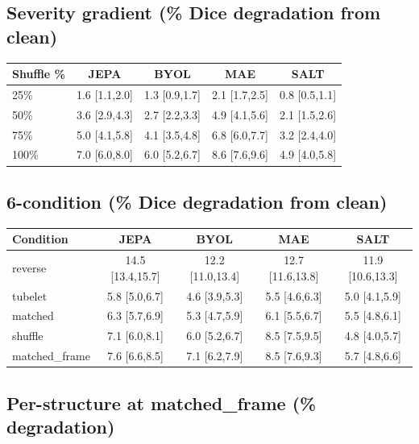 \documentclass{article}
\begin{document}
\subsection{Severity gradient (\% Dice degradation from clean)}

\begin{center}
\begin{tabular}{lcccc}
\toprule
Shuffle \% & JEPA & BYOL & MAE & SALT \\
\midrule
25\%  & 1.6 [1.1,2.0] & 1.3 [0.9,1.7] & 2.1 [1.7,2.5] & 0.8 [0.5,1.1] \\
50\%  & 3.6 [2.9,4.3] & 2.7 [2.2,3.3] & 4.9 [4.1,5.6] & 2.1 [1.5,2.6] \\
75\%  & 5.0 [4.1,5.8] & 4.1 [3.5,4.8] & 6.8 [6.0,7.7] & 3.2 [2.4,4.0] \\
100\% & 7.0 [6.0,8.0] & 6.0 [5.2,6.7] & 8.6 [7.6,9.6] & 4.9 [4.0,5.8] \\
\bottomrule
\end{tabular}
\end{center}

\subsection{6-condition (\% Dice degradation from clean)}

\begin{center}
\begin{tabular}{lcccc}
\toprule
Condition & JEPA & BYOL & MAE & SALT \\
\midrule
reverse       & 14.5 [13.4,15.7] & 12.2 [11.0,13.4] & 12.7 [11.6,13.8] & 11.9 [10.6,13.3] \\
tubelet       & 5.8 [5.0,6.7]    & 4.6 [3.9,5.3]    & 5.5 [4.6,6.3]    & 5.0 [4.1,5.9] \\
matched       & 6.3 [5.7,6.9]    & 5.3 [4.7,5.9]    & 6.1 [5.5,6.7]    & 5.5 [4.8,6.1] \\
shuffle       & 7.1 [6.0,8.1]    & 6.0 [5.2,6.7]    & 8.5 [7.5,9.5]    & 4.8 [4.0,5.7] \\
matched\_frame & 7.6 [6.6,8.5]   & 7.1 [6.2,7.9]    & 8.5 [7.6,9.3]    & 5.7 [4.8,6.6] \\
\bottomrule
\end{tabular}
\end{center}

\subsection{Per-structure at matched\_frame (\% degradation)}
\end{document}
